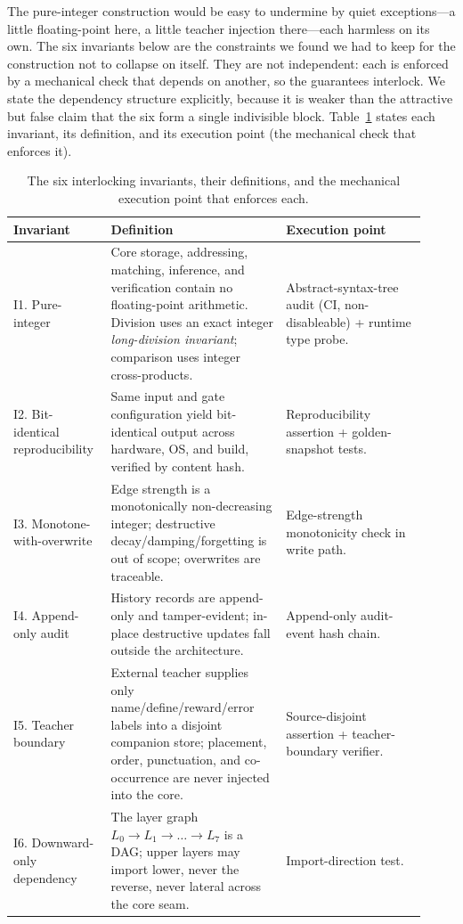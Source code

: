 \documentclass[11pt,a4paper]{article}
\begin{document}
The pure-integer construction would be easy to undermine by quiet
exceptions---a little floating-point here, a little teacher injection
there---each harmless on its own. The six invariants below are the
constraints we found we had to keep for the construction not to collapse
on itself. They are not independent: each is enforced by a mechanical
check that depends on another, so the guarantees interlock. We state the
dependency structure explicitly, because it is weaker than the attractive
but false claim that the six form a single indivisible block.
Table~\ref{tab:invariants} states each invariant, its definition, and its
execution point (the mechanical check that enforces it).

\begin{table}[t]
\centering
\small
\caption{The six interlocking invariants, their definitions, and the
mechanical execution point that enforces each.}
\label{tab:invariants}
\begin{tabular}{@{}p{0.20\linewidth}p{0.40\linewidth}p{0.32\linewidth}@{}}
\toprule
Invariant & Definition & Execution point \\
\midrule
I1. Pure-integer &
Core storage, addressing, matching, inference, and verification contain
no floating-point arithmetic. Division uses an exact integer
\emph{long-division invariant}; comparison uses integer cross-products. &
Abstract-syntax-tree audit (CI, non-disableable) + runtime type probe. \\
\addlinespace
I2. Bit-identical reproducibility &
Same input and gate configuration yield bit-identical output across
hardware, OS, and build, verified by content hash. &
Reproducibility assertion + golden-snapshot tests. \\
\addlinespace
I3. Monotone-with-overwrite &
Edge strength is a monotonically non-decreasing integer; destructive
decay/damping/forgetting is out of scope; overwrites are traceable. &
Edge-strength monotonicity check in write path. \\
\addlinespace
I4. Append-only audit &
History records are append-only and tamper-evident; in-place destructive
updates fall outside the architecture. &
Append-only audit-event hash chain. \\
\addlinespace
I5. Teacher boundary &
External teacher supplies only name/define/reward/error labels into a
disjoint companion store; placement, order, punctuation, and co-occurrence
are never injected into the core. &
Source-disjoint assertion + teacher-boundary verifier. \\
\addlinespace
I6. Downward-only dependency &
The layer graph $L_0 \to L_1 \to \dots \to L_7$ is a DAG; upper layers
may import lower, never the reverse, never lateral across the core seam. &
Import-direction test. \\
\bottomrule
\end{tabular}
\end{table}
\end{document}
